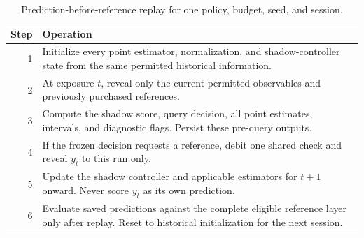 \begin{table}[H]
\centering\small
\caption{Prediction-before-reference replay for one policy, budget, seed, and session.}\label{tab:causal}
\begin{tabularx}{\linewidth}{@{}rY@{}}
\toprule
Step & Operation \\
 & Initialize every point estimator, normalization, and shadow-controller state from the same permitted historical information. \\
2 & At exposure $t$, reveal only the current permitted observables and previously purchased references. \\
3 & Compute the shadow score, query decision, all point estimates, intervals, and diagnostic flags. Persist these pre-query outputs. \\
4 & If the frozen decision requests a reference, debit one shared check and reveal $y_t$ to this run only. \\
5 & Update the shadow controller and applicable estimators for $t+1$ onward. Never score $y_t$ as its own prediction. \\
6 & Evaluate saved predictions against the complete eligible reference layer only after replay. Reset to historical initialization for the next session. \\
\bottomrule
\end{tabularx}
\end{table}
